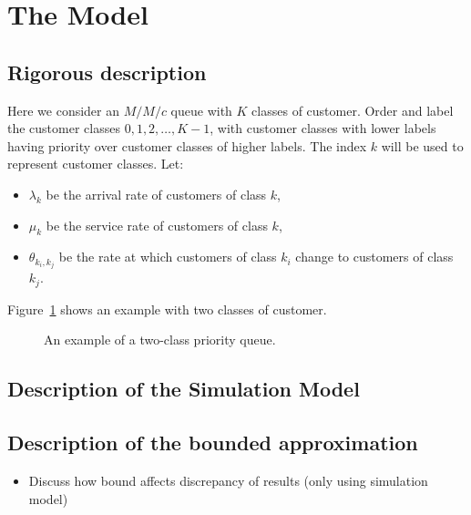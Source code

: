 \documentclass{article}
\begin{document}
\section{The Model}

\subsection{Rigorous description}

Here we consider an $M/M/c$ queue with $K$ classes of customer.
Order and label the customer classes $0, 1, 2, \dots, K-1$, with customer
classes with lower labels having priority over customer classes of higher
labels. The index $k$ will be used to represent customer classes.
Let:

\begin{itemize}
  \item $\lambda_k$ be the arrival rate of customers of class $k$,
  \item $\mu_k$ be the service rate of customers of class $k$,
  \item $\theta_{k_i,k_j}$ be the rate at which customers of class $k_i$ change
  to customers of class $k_j$.
\end{itemize}

Figure~\ref{fig:twoclass_example} shows an example with two classes of customer.

\begin{figure}
\begin{center}

\end{center}
\caption{An example of a two-class priority queue.}
\label{fig:twoclass_example}
\end{figure}

\subsection{Description of the Simulation Model}

\subsection{Description of the bounded approximation}

\begin{itemize}
    \item Discuss how bound affects discrepancy of results (only using
        simulation model)
\end{itemize}
\end{document}
